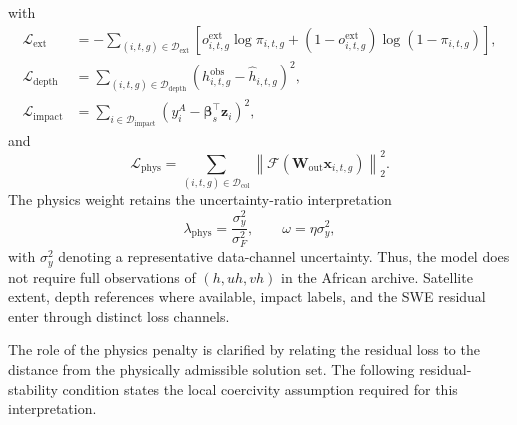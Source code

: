 \documentclass[pdflatex,sn-mathphys-ay]{sn-jnl}
\theoremstyle{thmstyleone}
\begin{document}
with
\begin{align}
  \mathcal{L}_{\mathrm{ext}}
  &=
  -
  \sum_{(i,t,g)\in\mathcal{D}_{\mathrm{ext}}}
  \left[
    o^{\mathrm{ext}}_{i,t,g}\log \pi_{i,t,g}
    +
    (1-o^{\mathrm{ext}}_{i,t,g})\log(1-\pi_{i,t,g})
  \right],
  \label{eq:extent_loss}
  \\
  \mathcal{L}_{\mathrm{depth}}
  &=
  \sum_{(i,t,g)\in\mathcal{D}_{\mathrm{depth}}}
  \left(
    h^{\mathrm{obs}}_{i,t,g}
    -
    \hat{h}_{i,t,g}
  \right)^2,
  \label{eq:depth_loss}
  \\
  \mathcal{L}_{\mathrm{impact}}
  &=
  \sum_{i\in\mathcal{D}_{\mathrm{impact}}}
  \left(
    y^{A}_{i}
    -
    \boldsymbol{\beta}_{s}^{\top}\mathbf{z}_{i}
  \right)^2,
  \label{eq:impact_loss}
\end{align}
and
\begin{equation}
  \mathcal{L}_{\mathrm{phys}}
  =
  \sum_{(i,t,g)\in\mathcal{D}_{\mathrm{col}}}
  \left\|
    \mathcal{F}
    \left(
      \mathbf{W}_{\mathrm{out}}\mathbf{x}_{i,t,g}
    \right)
  \right\|_{2}^{2}.
  \label{eq:padr_loss_terms}
\end{equation}
The physics weight retains the uncertainty-ratio interpretation
\begin{equation}
  \lambda_{\mathrm{phys}}
  =
  \frac{\sigma_y^2}{\sigma_F^2},
  \qquad
  \omega
  =
  \eta\sigma_y^2,
  \label{eq:padr_weights}
\end{equation}
with $\sigma_y^2$ denoting a representative data-channel uncertainty.
Thus, the model does not require full observations of $(h,uh,vh)$ in
the African archive.  Satellite extent, depth references where
available, impact labels, and the SWE residual enter through distinct
loss channels.

The role of the physics penalty is clarified by relating the residual
loss to the distance from the physically admissible solution set.  The following residual-stability condition states the
local coercivity assumption required for this interpretation.
\end{document}
